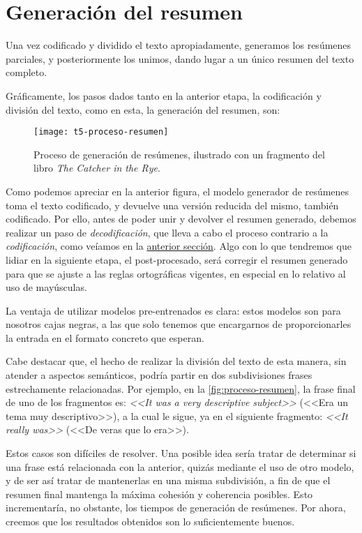 \section{Generación del resumen} \label{sec:resumen}

Una vez codificado y dividido el texto apropiadamente, generamos los resúmenes parciales, y posteriormente los unimos, dando lugar a un único resumen del texto completo.

Gráficamente, los pasos dados tanto en la anterior etapa, la codificación y división del texto, como en esta, la generación del resumen, son:

\begin{figure}[h]
	\centering
	\texttt{[image: t5-proceso-resumen]}
	\caption{Proceso de generación de resúmenes, ilustrado con un fragmento del libro \emph{The Catcher in the Rye}.}
	\label{fig:proceso-resumen}	
\end{figure}

Como podemos apreciar en la anterior figura, el modelo generador de resúmenes toma el texto codificado, y devuelve una versión reducida del mismo, también codificado. Por ello, antes de poder unir y devolver el resumen generado, debemos realizar un paso de \emph{decodificación}, que lleva a cabo el proceso contrario a la \emph{codificación}, como veíamos en la \hyperref[sec:codificacion]{anterior sección}. Algo con lo que tendremos que lidiar en la siguiente etapa, el post-procesado, será corregir el resumen generado para que se ajuste a las reglas ortográficas vigentes, en especial en lo relativo al uso de mayúsculas.

La ventaja de utilizar modelos pre-entrenados es clara: estos modelos son para nosotros cajas negras, a las que solo tenemos que encargarnos de proporcionarles la entrada en el formato concreto que esperan.

Cabe destacar que, el hecho de realizar la división del texto de esta manera, sin atender a aspectos semánticos, podría partir en dos subdivisiones frases estrechamente relacionadas. Por ejemplo, en la \autoref{fig:proceso-resumen}, la frase final de uno de los fragmentos es: \emph{<<It was a very descriptive subject>>} (<<Era un tema muy descriptivo>>), a la cual le sigue, ya en el siguiente fragmento: \emph{<<It really was>>} (<<De veras que lo era>>).

Estos casos son difíciles de resolver. Una posible idea sería tratar de determinar si una frase está relacionada con la anterior, quizás mediante el uso de otro modelo, y de ser así tratar de mantenerlas en una misma subdivisión, a fin de que el resumen final mantenga la máxima cohesión y coherencia posibles. Esto incrementaría, no obstante, los tiempos de generación de resúmenes. Por ahora, creemos que los resultados obtenidos son lo suficientemente buenos.

